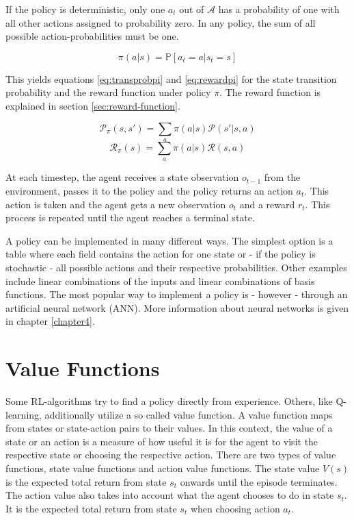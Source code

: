 If the policy is deterministic, only one $a_t$ out of $\mathcal{A}$ has a probability of one with all other actions assigned to probability zero. In any policy, the sum of all possible action-probabilities must be one.

\begin{equation}
\pi(a|s) = \mathbb{P}[a_t=a|s_t=s]
\end{equation}

This yields equations \ref{eq:transprobpi} and \ref{eq:rewardpi} for the state transition probability and the reward function under policy $\pi$. The reward function is explained in section \ref{sec:reward-function}.

\begin{equation}
\mathcal{P}_\pi(s,s')=\sum_a \pi(a|s)\mathcal{P}(s'|s,a)
\label{eq:transprobpi}
\end{equation}
\begin{equation}
\mathcal{R}_\pi(s) = \sum_a\pi(a|s)\mathcal{R}(s,a)
\label{eq:rewardpi}
\end{equation}

At each timestep, the agent receives a state observation $o_{t-1}$ from the environment, passes it to the policy and the policy returns an action $a_t$. This action is taken and the agent gets a new observation $o_t$ and a reward $r_t$. This process is repeated until the agent reaches a terminal state.

A policy can be implemented in many different ways. The simplest option is a table where each field contains the action for one state or - if the policy is stochastic - all possible actions and their respective probabilities. Other examples include linear combinations of the inputs and linear combinations of basis functions. The most popular way to implement a policy is - however - through an artificial neural network (ANN). More information about neural networks is given in chapter \ref{chapter4}.  

\section{Value Functions}
\label{sec:value-function}

Some RL-algorithms try to find a policy directly from experience. Others, like Q-learning, additionally utilize a so called value function. A value function maps from states or state-action pairs to their values. In this context, the value of a state or an action is a measure of how useful it is for the agent to visit the respective state or choosing the respective action. There are two types of value functions, state value functions and action value functions. The state value $V(s)$ is the expected total return from state $s_t$ onwards until the episode terminates. The action value also takes into account what the agent chooses to do in state $s_t$. It is the expected total return from state $s_t$ when choosing action $a_t$.

